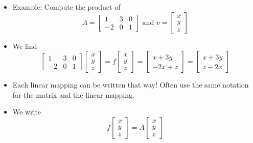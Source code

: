 \documentclass[8pt,dvipsnames]{beamer}
\begin{document}
\begin{frame}
  \begin{itemize}
  \item Example: Compute the product of 
    $$
    A =
    \begin{bmatrix}
        1 & 3 & 0\\
      -2 & 0 & 1
    \end{bmatrix}\text{ and }
    v =
    \begin{bmatrix}
      x\\y\\z
    \end{bmatrix}
    $$
    \pause
  \item We find 
    $$   
    \begin{bmatrix}
        1 & 3 & 0\\
      -2 & 0 & 1
    \end{bmatrix}\begin{bmatrix}
      x\\y\\z
    \end{bmatrix} = f
    \begin{bmatrix}
      x\\y\\z
    \end{bmatrix}
    =
    \begin{bmatrix}
      x+3y\\-2x+z
    \end{bmatrix}=
    \begin{bmatrix}
      x+3y\\z-2x
    \end{bmatrix}
    $$\pause
  \item \textcolor{RedOrange}{Each linear mapping can be written that way! Often use the same notation for the matrix and the linear mapping.}
  \vfill
  \item We write 
  $$
  f\begin{bmatrix}
    x\\y\\z
  \end{bmatrix} = A
  \begin{bmatrix}
    x\\y\\z
  \end{bmatrix}
  $$
\end{itemize}
\end{frame}
\end{document}
